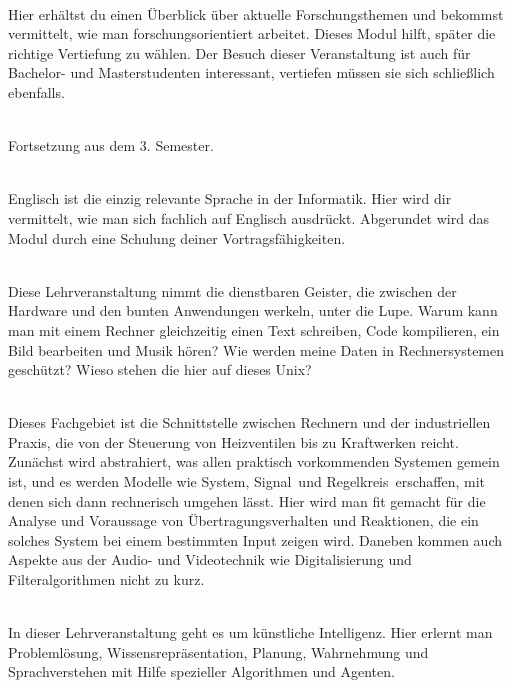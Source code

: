 \textbf{} \\
Hier erhältst du einen Überblick über aktuelle Forschungsthemen und bekommst vermittelt, wie man forschungsorientiert arbeitet.
Dieses Modul hilft, später die richtige Vertiefung zu wählen. Der Besuch dieser Veranstaltung ist auch für Bachelor- und Masterstudenten interessant, vertiefen müssen sie sich schließlich ebenfalls.

\textbf{} \\
Fortsetzung aus dem 3. Semester.

\textbf{} \\
Englisch ist die einzig relevante Sprache in der Informatik.
Hier wird dir vermittelt, wie man sich fachlich auf Englisch ausdrückt.
Abgerundet wird das Modul durch eine Schulung deiner Vortragsfähigkeiten.



\textbf{} \\
Diese Lehrveranstaltung nimmt die dienstbaren Geister, die zwischen der Hardware und den bunten Anwendungen werkeln, unter die Lupe.
Warum kann man mit einem Rechner gleichzeitig einen Text schreiben, Code kompilieren, ein Bild bearbeiten und Musik hören?
Wie werden meine Daten in Rechnersystemen geschützt?
Wieso stehen die hier auf dieses Unix?

\textbf{} \\
Dieses Fachgebiet ist die Schnittstelle zwischen Rechnern und der industriellen Praxis, die von der Steuerung von Heizventilen bis zu Kraftwerken reicht.
Zunächst wird abstrahiert, was allen praktisch vorkommenden Systemen gemein ist, und es werden Modelle wie \glqq System\grqq, \glqq Signal\grqq\ und \glqq Regelkreis\grqq\ erschaffen, mit denen sich dann rechnerisch umgehen lässt.
Hier wird man fit gemacht für die Analyse und Voraussage von Übertragungsverhalten und Reaktionen, die ein solches System bei einem bestimmten Input zeigen wird.
Daneben kommen auch Aspekte aus der Audio- und Videotechnik wie Digitalisierung und Filteralgorithmen nicht zu kurz.

\textbf{} \\
In dieser Lehrveranstaltung geht es um künstliche Intelligenz.
Hier erlernt man Problemlösung, Wissensrepräsentation, Planung, Wahrnehmung und Sprachverstehen mit Hilfe spezieller Algorithmen und Agenten.

